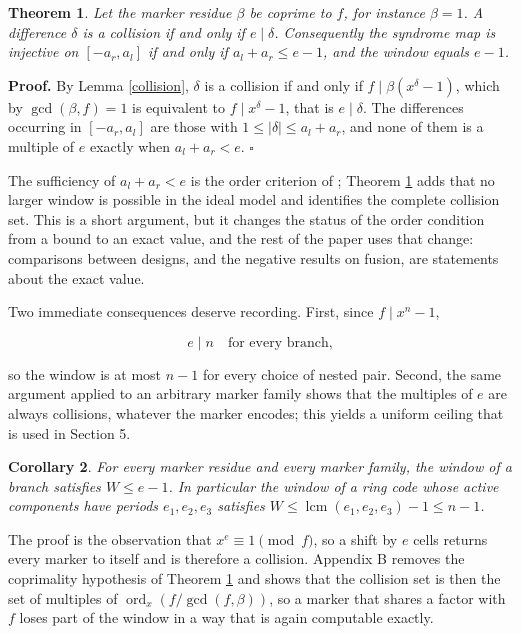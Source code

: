\documentclass[11pt,reqno]{amsart}
\newtheorem{theorem}{Theorem}[section]
\newtheorem{corollary}[theorem]{Corollary}
\theoremstyle{definition}
\theoremstyle{remark}
\newcommand{\ord}{\operatorname{ord}}
\newcommand{\lcm}{\operatorname{lcm}}
\begin{document}
\begin{theorem}\label{sharp}
Let the marker residue $\beta$ be coprime to $f$, for instance $\beta=1$. A difference $\delta$ is a collision if and only if $e\mid\delta$. Consequently the syndrome map is injective on $[-a_r,a_l]$ if and only if $a_l+a_r\le e-1$, and the window equals $e-1$.
\end{theorem}

\textbf{Proof.} By Lemma \ref{collision}, $\delta$ is a collision if and only if $f\mid\beta(x^\delta-1)$, which by $\gcd(\beta,f)=1$ is equivalent to $f\mid x^\delta-1$, that is $e\mid\delta$. The differences occurring in $[-a_r,a_l]$ are those with $1\le|\delta|\le a_l+a_r$, and none of them is a multiple of $e$ exactly when $a_l+a_r<e$. $\square$


The sufficiency of $a_l+a_r<e$ is the order criterion of \cite{FujiwaraTonchevWong2013,XieYangYuan2016,LuoMa2018}; Theorem \ref{sharp} adds that no larger window is possible in the ideal model and identifies the complete collision set. This is a short argument, but it changes the status of the order condition from a bound to an exact value, and the rest of the paper uses that change: comparisons between designs, and the negative results on fusion, are statements about the exact value.


Two immediate consequences deserve recording. First, since $f\mid x^n-1$,


\begin{equation}\label{eq:edivn}
e\mid n\quad\text{for every branch,}
\end{equation}

so the window is at most $n-1$ for every choice of nested pair. Second, the same argument applied to an arbitrary marker family shows that the multiples of $e$ are always collisions, whatever the marker encodes; this yields a uniform ceiling that is used in Section 5.


\begin{corollary}\label{ceiling}
For every marker residue and every marker family, the window of a branch satisfies $W\le e-1$. In particular the window of a ring code whose active components have periods $e_1,e_2,e_3$ satisfies $W\le\lcm(e_1,e_2,e_3)-1\le n-1$.
\end{corollary}

The proof is the observation that $x^e\equiv1\pmod f$, so a shift by $e$ cells returns every marker to itself and is therefore a collision. Appendix B removes the coprimality hypothesis of Theorem \ref{sharp} and shows that the collision set is then the set of multiples of $\ord_x(f/\gcd(f,\beta))$, so a marker that shares a factor with $f$ loses part of the window in a way that is again computable exactly.
\end{document}
